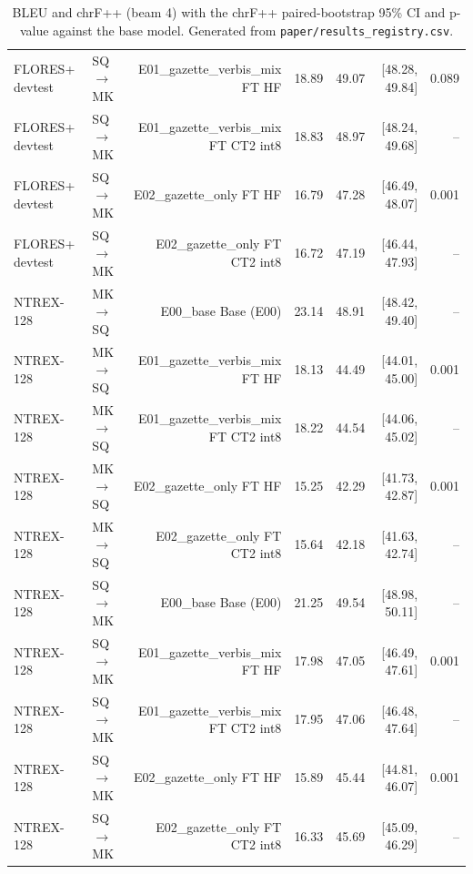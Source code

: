 \begin{table}[t]
\begin{tabular}{llrrrrr}
FLORES+ devtest & SQ$\rightarrow$MK & E01\_gazette\_verbis\_mix FT HF & 18.89 & 49.07 & [48.28, 49.84] & 0.089 \\
FLORES+ devtest & SQ$\rightarrow$MK & E01\_gazette\_verbis\_mix FT CT2 int8 & 18.83 & 48.97 & [48.24, 49.68] & – \\
FLORES+ devtest & SQ$\rightarrow$MK & E02\_gazette\_only FT HF & 16.79 & 47.28 & [46.49, 48.07] & 0.001 \\
FLORES+ devtest & SQ$\rightarrow$MK & E02\_gazette\_only FT CT2 int8 & 16.72 & 47.19 & [46.44, 47.93] & – \\
NTREX-128 & MK$\rightarrow$SQ & E00\_base Base (E00) & 23.14 & 48.91 & [48.42, 49.40] & – \\
NTREX-128 & MK$\rightarrow$SQ & E01\_gazette\_verbis\_mix FT HF & 18.13 & 44.49 & [44.01, 45.00] & 0.001 \\
NTREX-128 & MK$\rightarrow$SQ & E01\_gazette\_verbis\_mix FT CT2 int8 & 18.22 & 44.54 & [44.06, 45.02] & – \\
NTREX-128 & MK$\rightarrow$SQ & E02\_gazette\_only FT HF & 15.25 & 42.29 & [41.73, 42.87] & 0.001 \\
NTREX-128 & MK$\rightarrow$SQ & E02\_gazette\_only FT CT2 int8 & 15.64 & 42.18 & [41.63, 42.74] & – \\
NTREX-128 & SQ$\rightarrow$MK & E00\_base Base (E00) & 21.25 & 49.54 & [48.98, 50.11] & – \\
NTREX-128 & SQ$\rightarrow$MK & E01\_gazette\_verbis\_mix FT HF & 17.98 & 47.05 & [46.49, 47.61] & 0.001 \\
NTREX-128 & SQ$\rightarrow$MK & E01\_gazette\_verbis\_mix FT CT2 int8 & 17.95 & 47.06 & [46.48, 47.64] & – \\
NTREX-128 & SQ$\rightarrow$MK & E02\_gazette\_only FT HF & 15.89 & 45.44 & [44.81, 46.07] & 0.001 \\
NTREX-128 & SQ$\rightarrow$MK & E02\_gazette\_only FT CT2 int8 & 16.33 & 45.69 & [45.09, 46.29] & – \\
\bottomrule
\end{tabular}
\caption{BLEU and chrF++ (beam 4) with the chrF++ paired-bootstrap 95\% CI and p-value against the base model. Generated from \texttt{paper/results\_registry.csv}.}
\label{tab:main-results}
\end{table}
